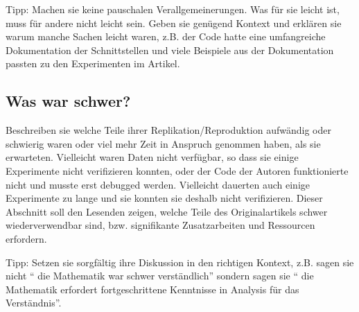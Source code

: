 \documentclass[DIV=13,fontsize=11pt]{scrartcl}
\begin{document}
Tipp: Machen sie keine pauschalen Verallgemeinerungen. Was für sie leicht ist, muss für andere nicht leicht sein. Geben sie genügend Kontext und erklären sie warum manche Sachen leicht waren, z.B. der Code hatte eine umfangreiche Dokumentation der Schnittstellen und viele Beispiele aus der Dokumentation passten zu den Experimenten im Artikel.


\subsection{Was war schwer?}
Beschreiben sie welche Teile ihrer Replikation/Reproduktion aufwändig oder schwierig waren oder viel mehr Zeit in Anspruch genommen haben, als sie erwarteten.
Vielleicht waren Daten nicht verfügbar, so dass sie einige Experimente nicht verifizieren konnten, oder der Code der Autoren funktionierte nicht und musste erst debugged werden.
Vielleicht dauerten auch einige Experimente zu lange und sie konnten sie deshalb nicht verifizieren.
Dieser Abschnitt soll den Lesenden zeigen, welche Teile des Originalartikels schwer wiederverwendbar sind, bzw. signifikante Zusatzarbeiten und Ressourcen erfordern.


Tipp: Setzen sie sorgfältig ihre Diskussion in den richtigen Kontext, z.B. sagen sie nicht `` die Mathematik war schwer verständlich'' sondern sagen sie `` die Mathematik erfordert fortgeschrittene Kenntnisse in Analysis für das Verständnis''.

\end{document}
